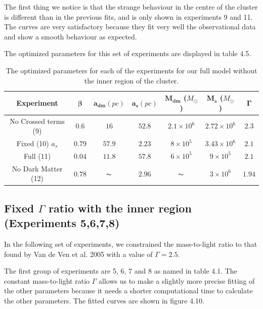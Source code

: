 The first thing we notice is that the strange behaviour in the centre of the cluster is different than in the previous fits, and is only shown in experiments 9 and 11. The curves are very satisfactory because they fit very well the observational data and show a smooth behaviour as expected. 

The optimized parameters for this set of experiments are displayed in table 4.5.

\begin{table}[H]
\begin{center}
\begin{tabular}{| c| c| c| c| c| c| c|}
    \hline
    \textbf{Experiment} & $\mathbf{\beta}$ & $\mathbf{a_{dm}} (pc)$ & $\mathbf{a_{s}} (pc)$ & $\mathbf{M_{dm}}$ ($M_{\odot}$) & $\mathbf{M_{s}}$ ($M_{\odot}$) & $\mathbf{\Gamma}$\\ \hline
	No Crossed terms (9) & $0.6$ &	$16$ &	$52.8$ &	$2.1 \times 10^{6}$ &	$2.72 \times 10^{6}$ &	$2.3$\\ \hline
	Fixed (10) $a_s$ &	$0.79$ &	$57.9$ &	$2.23$ &	$8 \times 10^{5}$ &	$3.43 \times 10 ^{6}$ &	$2.1$\\ \hline
	Full (11) &	$0.04$ &	$11.8$ &	$57.8$ &	$6 \times 10^{5}$ &	$9 \times 10^{5}$ &	$2.1$\\ \hline
	No Dark Matter (12) &	$0.78$ &	$\thicksim$ & $2.96$ &	$\thicksim$ & $ 3 \times 10^{6}$ & 	$1.94$\\
    \hline
  \end{tabular} 
\caption[Optimized parameters for our full model without the inner region.]{The optimized parameters for each of the experiments for our full model without the inner region of the cluster.}
\end{center}
\end{table}

\subsection{Fixed $\Gamma$ ratio with the inner region (Experiments 5,6,7,8)}

In the following set of experiments, we constrained the mass-to-light ratio to that found by Van de Ven et al. 2005 with a value of $\Gamma = 2.5$. 

The first group of experiments are 5, 6, 7 and 8 as named in table 4.1. The constant mass-to-light ratio $\Gamma$ allows us to make a slightly more precise fitting of the other parameters because it needs a shorter computational time to calculate the other parameters. The fitted curves are shown in figure 4.10. 

